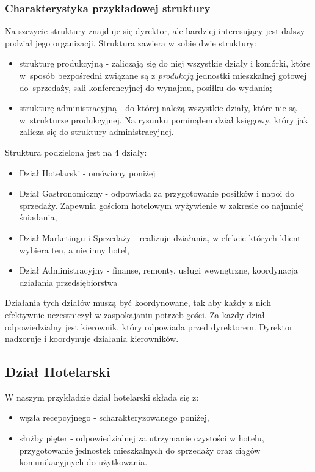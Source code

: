 \documentclass[a4paper,onecolumn,oneside,11pt,wide,floatssmall]{mwrep}
\theoremstyle{definition}
\theoremstyle{plain}%
\theoremstyle{remark}
\begin{document}
\subsubsection{Charakterystyka przykładowej struktury}
Na szczycie struktury znajduje się dyrektor, ale bardziej interesujący jest dalszy 
podział jego organizacji. Struktura zawiera w sobie dwie struktury:
\begin{itemize}
  \item strukturę produkcyjną - zaliczają się do niej wszystkie działy i 
  komórki, które \mbox{w sposób} bezpośredni związane są z \emph{produkcją}
  jednostki mieszkalnej gotowej \mbox{do sprzedaży}, sali konferencyjnej do 
  wynajmu, posiłku do wydania;
  \item strukturę administracyjną - do której należą wszystkie działy, które
   nie są \mbox{w strukturze} produkcyjnej. Na rysunku pominąłem dział księgowy, 
   który jak zalicza się do struktury administracyjnej.
\end{itemize}

Struktura podzielona jest na 4 działy:
\begin{itemize}
  \item Dział Hotelarski - omówiony poniżej
  \item Dział Gastronomiczny - odpowiada za przygotowanie posiłków i napoi 
  do sprzedaży. Zapewnia gościom hotelowym wyżywienie w zakresie co najmniej 
  śniadania,
  \item Dział Marketingu i Sprzedaży - realizuje działania, w efekcie 
  których klient wybiera ten, a nie inny hotel,
  \item Dział Administracyjny - finanse, remonty, usługi wewnętrzne, 
  koordynacja działania przedsiębiorstwa
\end{itemize}

Działania tych działów muszą być koordynowane, tak aby każdy z nich 
efektywnie uczestniczył w zaspokajaniu potrzeb gości. Za każdy dział 
odpowiedzialny jest kierownik, który odpowiada przed dyrektorem. Dyrektor
 nadzoruje i koordynuje działania kierowników.

\subsection{Dział Hotelarski}
W naszym przykładzie dział hotelarski składa się z:
\begin{itemize}
  \item węzła recepcyjnego - scharakteryzowanego poniżej,
  \item służby pięter - odpowiedzialnej za utrzymanie czystości w hotelu, 
  przygotowanie jednostek mieszkalnych do sprzedaży oraz ciągów 
  komunikacyjnych do użytkowania.
\end{itemize}
\end{document}
